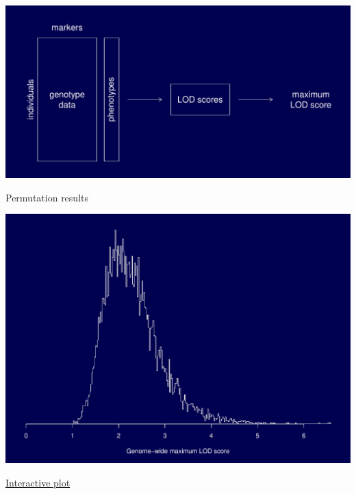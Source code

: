 \documentclass[12pt]{article}
\newcommand{\headsize}{\fontsize{35}{35} \selectfont}
\begin{document}
\vspace{2cm}

\centerline{\includegraphics{FigsA/permtest.pdf}}

\newpage

\headsize \color{myyellow}
\hfill \begin{minipage}{5.75in}
\centering
Permutation results
\end{minipage}

\vfill

\centerline{\includegraphics{FigsA/perm_hist.pdf}}



\newpage

\headsize \color{myyellow}
\hfill \begin{minipage}{5.75in}
\centering
\href{http://www.biostat.wisc.edu/~kbroman/D3/lod_random/}{Interactive plot}
\end{minipage}

\vspace{2cm}
\end{document}
